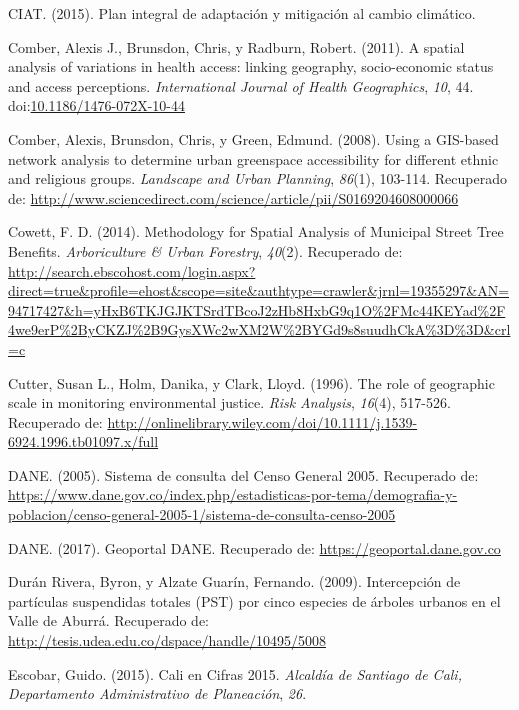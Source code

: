\documentclass[12pt,a4paper,openany]{book}
\theoremstyle{definition}
\theoremstyle{definition}
\theoremstyle{definition}
\theoremstyle{remark}
\begin{document}
\hypertarget{ref-ciat_plan_2015}{}
CIAT. (2015). Plan integral de adaptación y mitigación al cambio
climático.

\hypertarget{ref-comber_spatial_2011}{}
Comber, Alexis J., Brunsdon, Chris, y Radburn, Robert. (2011). A spatial
analysis of variations in health access: linking geography,
socio-economic status and access perceptions. \emph{International
Journal of Health Geographics}, \emph{10}, 44.
doi:\href{https://doi.org/10.1186/1476-072X-10-44}{10.1186/1476-072X-10-44}

\hypertarget{ref-comber_using_2008}{}
Comber, Alexis, Brunsdon, Chris, y Green, Edmund. (2008). Using a
GIS-based network analysis to determine urban greenspace accessibility
for different ethnic and religious groups. \emph{Landscape and Urban
Planning}, \emph{86}(1), 103-114. Recuperado de:
\url{http://www.sciencedirect.com/science/article/pii/S0169204608000066}

\hypertarget{ref-cowett_methodology_2014}{}
Cowett, F. D. (2014). Methodology for Spatial Analysis of Municipal
Street Tree Benefits. \emph{Arboriculture \& Urban Forestry},
\emph{40}(2). Recuperado de:
\url{http://search.ebscohost.com/login.aspx?direct=true\&profile=ehost\&scope=site\&authtype=crawler\&jrnl=19355297\&AN=94717427\&h=yHxB6TKJGJKTSrdTBcoJ2zHb8HxbG9q1O\%2FMc44KEYad\%2F4we9erP\%2ByCKZJ\%2B9GysXWc2wXM2W\%2BYGd9s8suudhCkA\%3D\%3D\&crl=c}

\hypertarget{ref-cutter_role_1996}{}
Cutter, Susan L., Holm, Danika, y Clark, Lloyd. (1996). The role of
geographic scale in monitoring environmental justice. \emph{Risk
Analysis}, \emph{16}(4), 517-526. Recuperado de:
\url{http://onlinelibrary.wiley.com/doi/10.1111/j.1539-6924.1996.tb01097.x/full}

\hypertarget{ref-censo_sistema_dane}{}
DANE. (2005). Sistema de consulta del Censo General 2005. Recuperado de:
\url{https://www.dane.gov.co/index.php/estadisticas-por-tema/demografia-y-poblacion/censo-general-2005-1/sistema-de-consulta-censo-2005}

\hypertarget{ref-geoportal_DANE}{}
DANE. (2017). Geoportal DANE. Recuperado de:
\url{https://geoportal.dane.gov.co}

\hypertarget{ref-duran_rivera_intercepcion_2009}{}
Durán Rivera, Byron, y Alzate Guarín, Fernando. (2009). Intercepción de
partículas suspendidas totales (PST) por cinco especies de árboles
urbanos en el Valle de Aburrá. Recuperado de:
\url{http://tesis.udea.edu.co/dspace/handle/10495/5008}

\hypertarget{ref-escobar2015cali}{}
Escobar, Guido. (2015). Cali en Cifras 2015. \emph{Alcaldía de Santiago
de Cali, Departamento Administrativo de Planeación}, \emph{26}.
\end{document}
